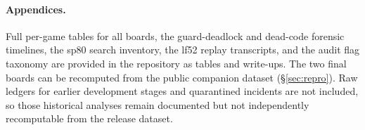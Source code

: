 \documentclass[11pt]{article}
\begin{document}
\bigskip
\paragraph{Appendices.} Full per-game tables for all boards, the guard-deadlock and dead-code forensic timelines, the sp80 search inventory, the lf52 replay transcripts, and the audit flag taxonomy are provided in the repository as tables and write-ups. The two final boards can be recomputed from the public companion dataset (\S\ref{sec:repro}). Raw ledgers for earlier development stages and quarantined incidents are not included, so those historical analyses remain documented but not independently recomputable from the release dataset.

\nocite{chollet2019measure,openai_twosettings}


{\small}
\end{document}
